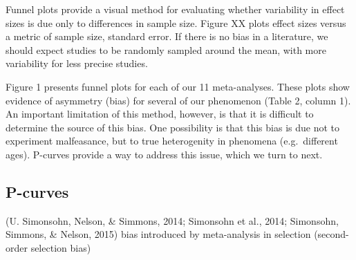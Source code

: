 \documentclass[american,floatsintext,man]{apa6}
\begin{document}
Funnel plots provide a visual method for evaluating whether variability
in effect sizes is due only to differences in sample size. Figure XX
plots effect sizes versus a metric of sample size, standard error. If
there is no bias in a literature, we should expect studies to be
randomly sampled around the mean, with more variability for less precise
studies.

Figure 1 presents funnel plots for each of our 11 meta-analyses. These
plots show evidence of asymmetry (bias) for several of our phenomenon
(Table 2, column 1). An important limitation of this method, however, is
that it is difficult to determine the source of this bias. One
possibility is that this bias is due not to experiment malfeasance, but
to true heterogenity in phenomena (e.g.~different ages). P-curves
provide a way to address this issue, which we turn to next.

\subsection{P-curves}\label{p-curves}

(U. Simonsohn, Nelson, \& Simmons, 2014; Simonsohn et al., 2014;
Simonsohn, Simmons, \& Nelson, 2015) bias introduced by meta-analysis in
selection (second-order selection bias)
\end{document}
